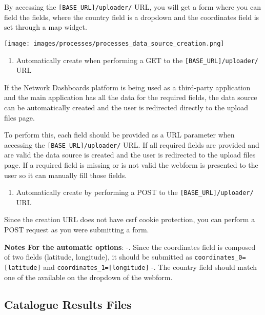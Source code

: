 \documentclass[
]{book}
\providecommand{\tightlist}{%
  \setlength{\itemsep}{0pt}\setlength{\parskip}{0pt}}
\begin{document}
By accessing the \texttt{{[}BASE\_URL{]}/uploader/} URL, you will get a form where you can field the fields, where the country field is a dropdown and the coordinates field is set through a map widget.

\texttt{[image: images/processes/processes\_data\_source\_creation.png]}

\begin{enumerate}
\def\labelenumi{\arabic{enumi}.}
\setcounter{enumi}{1}
\tightlist
\item
  Automatically create when performing a GET to the \texttt{{[}BASE\_URL{]}/uploader/} URL
\end{enumerate}

If the Network Dashboards platform is being used as a third-party application and the main application has all the data for the required fields, the data source can be automatically created and the user is redirected directly to the upload files page.

To perform this, each field should be provided as a URL parameter when accessing the \texttt{{[}BASE\_URL{]}/uploader/} URL. If all required fields are provided and are valid the data source is created and the user is redirected to the upload files page. If a required field is missing or is not valid the webform is presented to the user so it can manually fill those fields.

\begin{enumerate}
\def\labelenumi{\arabic{enumi}.}
\setcounter{enumi}{2}
\tightlist
\item
  Automatically create by performing a POST to the \texttt{{[}BASE\_URL{]}/uploader/} URL
\end{enumerate}

Since the creation URL does not have csrf cookie protection, you can perform a POST request as you were submitting a form.

\textbf{Notes For the automatic options}:
-. Since the coordinates field is composed of two fields (latitude, longitude), it should be submitted as \texttt{coordinates\_0={[}latitude{]}} and \texttt{coordinates\_1={[}longitude{]}}
-. The country field should match one of the available on the dropdown of the webform.

\hypertarget{catalogue-results-files}{%
\subsection*{Catalogue Results Files}\label{catalogue-results-files}}
\end{document}
